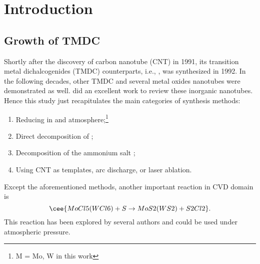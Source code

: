 \section{Introduction}
\subsection{Growth of TMDC}
Shortly after the discovery of carbon nanotube (CNT) in 1991,\cite{Iijima1991} its transition metal dichalcogenides (TMDC) counterparts, i.e., , was synthesized in 1992.\cite{Tenne1992} In the following decades, other TMDC and several metal oxides nanotubes were demonstrated as well. \citeauthor{Rao2003} did an excellent work to review these inorganic nanotubes.\cite{Rao2003} Hence this study just recapitulates the main categories of synthesis methods:
\begin{enumerate}
\item Reducing  in  and  atmosphere;\footnote{M = Mo, W in this work}
\item Direct decomposition of ;
\item Decomposition of the ammonium salt ;
\item Using CNT as templates, arc discharge, or laser ablation.
\end{enumerate}
Except the aforementioned methods, another important reaction in CVD domain is
\begin{equation}\label{eq:mclns}
\cee{MoCl5(WCl6) + S \rightarrow MoS2(WS2) + S2Cl2}.
\end{equation}
This reaction has been explored by several authors\cite{Stoffels1999} and could be used under atmospheric pressure.\cite{Li2004a}


